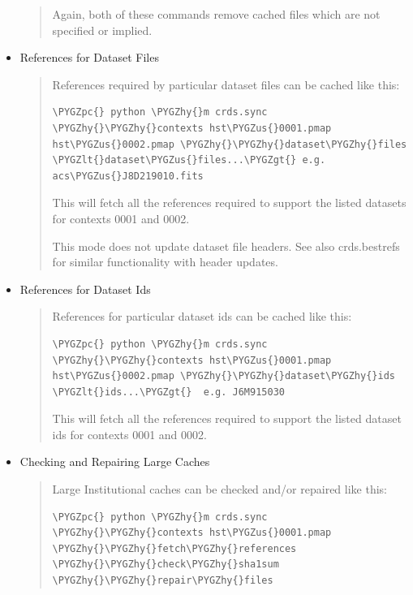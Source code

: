 \documentclass[letterpaper,10pt,english]{sphinxmanual}
\def\PYGZus{\char`\_}
\def\PYGZlt{\char`\<}
\def\PYGZgt{\char`\>}
\def\PYGZpc{\char`\%}
\def\PYGZhy{\char`\-}
\begin{document}
\begin{itemize}
\begin{quote}
Again, both of these commands remove cached files which are not specified or implied.
\end{quote}

\item {} 
References for Dataset Files
\begin{quote}

References required by particular dataset files can be cached like this:

\begin{Verbatim}[commandchars=\\\{\}]
\PYGZpc{} python \PYGZhy{}m crds.sync  \PYGZhy{}\PYGZhy{}contexts hst\PYGZus{}0001.pmap hst\PYGZus{}0002.pmap \PYGZhy{}\PYGZhy{}dataset\PYGZhy{}files  \PYGZlt{}dataset\PYGZus{}files...\PYGZgt{} e.g. acs\PYGZus{}J8D219010.fits
\end{Verbatim}

This will fetch all the references required to support the listed datasets for contexts 0001 and 0002.

This mode does not update dataset file headers.  See also crds.bestrefs for similar functionality with header updates.
\end{quote}

\item {} 
References for Dataset Ids
\begin{quote}

References for particular dataset ids can be cached like this:

\begin{Verbatim}[commandchars=\\\{\}]
\PYGZpc{} python \PYGZhy{}m crds.sync  \PYGZhy{}\PYGZhy{}contexts hst\PYGZus{}0001.pmap hst\PYGZus{}0002.pmap \PYGZhy{}\PYGZhy{}dataset\PYGZhy{}ids  \PYGZlt{}ids...\PYGZgt{}  e.g. J6M915030
\end{Verbatim}

This will fetch all the references required to support the listed dataset ids for contexts 0001 and 0002.
\end{quote}

\item {} 
Checking and Repairing Large Caches
\begin{quote}

Large Institutional caches can be checked and/or repaired like this:

\begin{Verbatim}[commandchars=\\\{\}]
\PYGZpc{} python \PYGZhy{}m crds.sync \PYGZhy{}\PYGZhy{}contexts hst\PYGZus{}0001.pmap \PYGZhy{}\PYGZhy{}fetch\PYGZhy{}references \PYGZhy{}\PYGZhy{}check\PYGZhy{}sha1sum \PYGZhy{}\PYGZhy{}repair\PYGZhy{}files
\end{Verbatim}


\end{quote}
\end{itemize}
\end{document}
